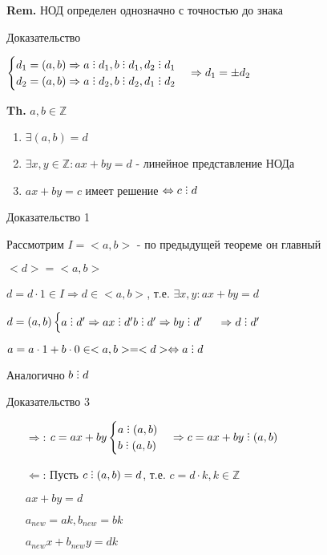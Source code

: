 \documentclass[14pt, letter paper]{article}
\def\divby{%
  \mathrel{\text{\vbox{\baselineskip.65ex\lineskiplimit0pt\hbox{.}\hbox{.}\hbox{.}}}}%
}
\begin{document}
\textbf{Rem.} НОД определен однозначно с точностью до знака

\begin{center}
    Доказательство
\end{center}

$\begin{cases}
d_1 = (a, b) \Rightarrow a \divby d_1, b \divby d_1, d_2 \divby d_1 \\
d_2 = (a, b) \Rightarrow a \divby d_2, b \divby d_2, d_1 \divby d_2
\end{cases} \Rightarrow d_1 = \pm d_2$

\textbf{Th.} $a, b \in \mathds{Z}$

\begin{enumerate}
    \item $\exists (a, b) = d$
    \item $\exists x, y \in \mathds{Z}: ax + by = d$ - линейное представление НОДа
    \item $ax + by = c$ имеет решение $\Leftrightarrow c \divby d$
\end{enumerate}

\begin{center}
    Доказательство 1
\end{center}

Рассмотрим $I = <a, b>$ - по предыдущей теореме он главный

$<d> = <a, b>$

$d = d \cdot 1 \in I \Rightarrow d \in <a, b>$, т.е. $\exists x, y : ax + by = d$

$d = (a, b) \begin{cases}
    a \divby d' \Rightarrow ax \divby d'
    b \divby d' \Rightarrow by \divby d'
\end{cases}$
$\Rightarrow d \divby d'$

$a = a \cdot 1 + b \cdot 0 \in <a, b> = <d> \Leftrightarrow a \divby d$

Аналогично $b \divby d$

\begin{center}
    Доказательство 3
\end{center}

\begin{itemize}
    \item[$\Rightarrow$:] $c = ax + by \begin{cases} a \divby (a, b) \\ b \divby (a, b) \end{cases} \Rightarrow c = ax + by \divby (a, b)$
    \item[$\Leftarrow$:] Пусть $c \divby (a, b) = d$, т.е. $c = d \cdot k, k \in \mathds{Z}$
    
    $ax + by = d$

    $a_{new} = ak, b_{new} = bk$ 

    $a_{new}x + b_{new}y = dk$
\end{itemize}
\end{document}
